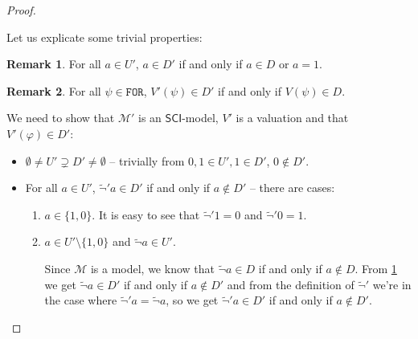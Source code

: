\documentclass{article}
\theoremstyle{definition}
\theoremstyle{definition}
\theoremstyle{definition}
\newtheorem{remark}{Remark}[section]
\newcommand*{\FOR}{\texttt{FOR}}
\newcommand{\SCI}{$\mathsf{SCI}$\xspace}
\begin{document}
\begin{proof}
\begin{itemize}
    \end{itemize}
    Let us explicate some trivial properties:
    \begin{remark}
        \label{trivial_1}
        For all $a \in U'$, $a \in D'$ if and only if $a \in D$ or $a = 1$.
    \end{remark}
    \begin{remark}
        \label{trivial_2}
        For all $\psi \in \FOR$, $V'(\psi) \in D'$ if and only if $V(\psi) \in D$.
    \end{remark}
    We need to show that $\mathcal{M'}$ is an \SCI-model, $V'$ is a valuation and
    that $V'(\varphi) \in D'$:
    \begin{itemize}
        \item $\emptyset \not = U' \supsetneq D' \not = \emptyset$ -- trivially from $0, 1 \in U', 1 \in D'$, $0 \not \in D'$.
        \item For all $a \in U'$, $\tilde{\lnot}'a \in D'$ if and only if $a \not \in D'$ --
              there are cases:
              \begin{enumerate}
                  \item[1°] $a \in \{1, 0\}$. It is easy to see that $\tilde{\lnot}'1 = 0$ and $\tilde{\lnot}'0 = 1$.
                  \item[2°] $a \in U' \setminus \{1, 0\}$ and $\tilde{\lnot} a \in U'$.

                      Since $\mathcal{M}$ is a model, we know that $\tilde{\lnot}a \in D$ if and only
                      if $a \not \in D$. From \cref{trivial_1} we get $\tilde{\lnot}a \in D'$ if and
                      only if $a \not \in D'$ and from the definition of $\tilde{\lnot}'$ we're in
                      the case where $\tilde{\lnot}'a = \tilde{\lnot} a$, so we get $\tilde{\lnot}'a
                          \in D'$ if and only if $a \not \in D'$.


\end{enumerate}
\end{itemize}
\end{proof}
\end{document}
